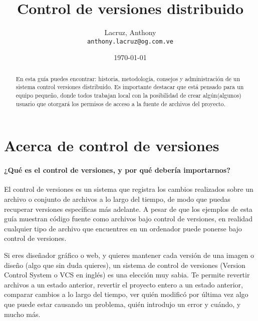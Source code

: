 \documentclass[12pt]{article}
\title{Control de versiones distribuido}
\author{
	Lacruz, Anthony\\
	\texttt{anthony.lacruz@og.com.ve}
}
\date{\today}
\begin{document}
	\maketitle

	\begin{abstract}
		En esta guía puedes encontrar: historia, metodología, consejos y administración de un sistema control versiones distribuido. Es importante destacar que está pensado para un equipo pequeño, donde todos trabajan local con la posibilidad de crear algún(algunos) usuario que otorgará los permisos de acceso a la fuente de archivos del proyecto.
	\end{abstract}
	
	\newpage
	\tableofcontents
	\newpage
	
	\section{Acerca de control de versiones}{		
		\paragraph{¿Qué es el control de versiones, y por qué debería importarnos? }
		{
		El control de versiones es un sistema que registra los cambios realizados sobre un archivo o conjunto de archivos a lo largo del tiempo, de modo que puedas recuperar versiones específicas más adelante. A pesar de que los ejemplos de esta guía muestran código fuente como archivos bajo control de versiones, en realidad cualquier tipo de archivo que encuentres en un ordenador puede ponerse bajo control de versiones.
		
		Si eres diseñador gráfico o web, y quieres mantener cada versión de una imagen o diseño (algo que sin duda quieres), un sistema de control de versiones (Version Control System o VCS en inglés) es una elección muy sabia. Te permite revertir archivos a un estado anterior, revertir el proyecto entero a un estado anterior, comparar cambios a lo largo del tiempo, ver quién modificó por última vez algo que puede estar causando un problema, quién introdujo un error y cuándo, y mucho más. 
		}
	}
\end{document}
